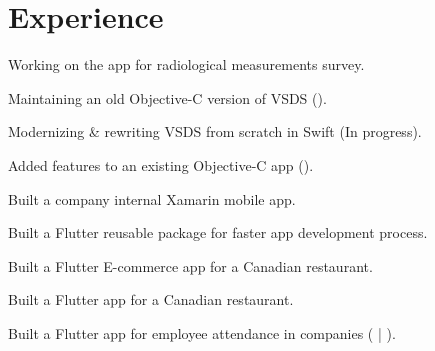 \documentclass[]{Resume}
\begin{document}
\hfill
\begin{minipage}[t]{0.63\textwidth} 


\section{Experience}

\vspace{\topsep} %
\begin{tightemize}
\item Working on the  app for radiological measurements survey.
\item Maintaining an old Objective-C version of VSDS ().
\item Modernizing \& rewriting VSDS from scratch in Swift (In progress).
\end{tightemize}
\sectionsep

\begin{tightemize}
\item Added features to an existing Objective-C app ().
\item Built a company internal Xamarin mobile app.
\item Built a Flutter reusable package for faster app development process.
\item Built a Flutter E-commerce app for a Canadian restaurant.
\item Built a Flutter app for a Canadian restaurant.
\item Built a Flutter app for employee attendance in companies ( | ).
\end{tightemize}
\sectionsep


\end{minipage}
\end{document}
